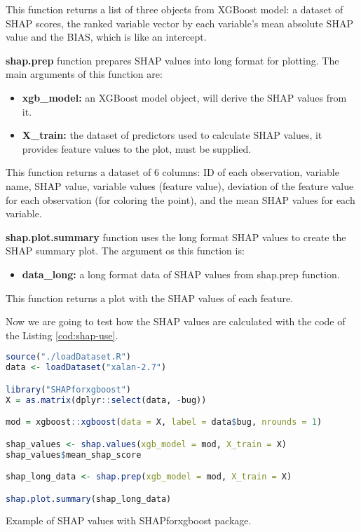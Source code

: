This function returns a list of three objects from XGBoost model: a dataset of SHAP scores, the ranked variable vector by each variable’s mean absolute SHAP value and the BIAS, which is like an intercept.

\textbf{shap.prep} function prepares SHAP values into long format for plotting. The main arguments of this function are:

\begin{itemize}
    \item \textbf{xgb\_model:} an XGBoost model object, will derive the SHAP values from it.

    \item \textbf{X\_train:} the dataset of predictors used to calculate SHAP values, it provides feature values to the plot, must be supplied.
\end{itemize}

This function returns a dataset of 6 columns: ID of each observation, variable name, SHAP value, variable values
(feature value), deviation of the feature value for each observation (for coloring the point), and the
mean SHAP values for each variable.

\textbf{shap.plot.summary} function uses the long format SHAP values to create the SHAP summary plot. The argument os this function is:

\begin{itemize}
    \item \textbf{data\_long:} a long format data of SHAP values from shap.prep function.
\end{itemize}

This function returns a plot with the SHAP values of each feature.

Now we are going to test how the SHAP values are calculated with the code of the Listing \ref{cod:shap-use}.

\begin{codefloat}[H]
\begin{lstlisting}[language=R, style=Ccolor]
source("./loadDataset.R")
data <- loadDataset("xalan-2.7")

library("SHAPforxgboost")
X = as.matrix(dplyr::select(data, -bug))

mod = xgboost::xgboost(data = X, label = data$bug, nrounds = 1)

shap_values <- shap.values(xgb_model = mod, X_train = X)
shap_values$mean_shap_score

shap_long_data <- shap.prep(xgb_model = mod, X_train = X)

shap.plot.summary(shap_long_data)
\end{lstlisting}
\caption{Example of SHAP values with SHAPforxgboost package.}
\label{cod:shap-use}
\end{codefloat}

